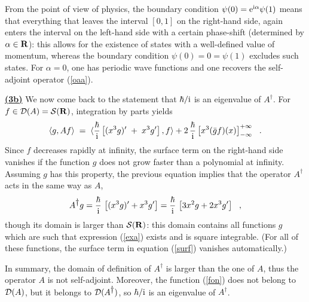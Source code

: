 \documentclass[a4wide,12pt]{report}
\begin{document}
From the point of view of physics, the boundary condition 
$\psi(0) = 
{\rm e}^{\ri \alpha} \psi(1)$ means that everything that 
leaves the interval $[ 0,1]$ on the right-hand side, again enters 
the interval on the left-hand side with a certain phase-shift
(determined by $\alpha \in \br$):
this allows for the existence of states with a well-defined value of
momentum, whereas the boundary condition $\psi(0) = 0 = \psi(1)$
excludes such states. 
For $\alpha =0$, one has periodic wave functions and one 
recovers the self-adjoint operator (\ref{oaa}).

 
\bigskip
 
\underline{{\bf (3b)}}
We now come back to the statement that $\hbar /\ri$ is an eigenvalue of 
$A^{\dag}$.
For $f \in {\cal D}(A) = \st$, 
integration by parts yields
\begin{equation}
\label{surf}
\langle g, A f \rangle \; = \;  \langle \ds{\hbar \over \ri} \left[
(x^3 g)^{\prime} \; + \; 
x^3 g^{\prime} \right] , f \rangle +
2 \, \ds{\hbar \over \ri} \left[
x^3 (\bar g  f)(x) \right]_{-\infty}^{+\infty}
\ \ .
\end{equation}
Since $f$ decreases rapidly at infinity, 
the surface term on the right-hand side vanishes if the function $g$
does not grow faster than a polynomial at infinity. 
Assuming $g$ has this property, 
the previous equation implies that the operator 
$A^{\dag}$ acts in the same way as $A$,
\begin{equation}
\label{exa}
A^{\dag} g = \ds{\hbar \over \ri} \, \left[ (x^3 g)^{\prime}
+x^3 g^{\prime} \right]
= \ds{\hbar \over \ri} \, \left[ 3x^2 g
+ 2 x^3 g^{\prime} \right]
\ \ ,
\end{equation}
though its domain is larger than $\st$:
this domain contains all functions $g$ which are such that  
expression  (\ref{exa}) exists and is square integrable. 
(For all of these functions, the surface term in equation 
(\ref{surf}) vanishes automatically.)
 
In summary, the domain of definition of $A^{\dag}$ is larger 
than the one of $A$, thus the operator $A$ is not self-adjoint. 
Moreover, the function (\ref{fon}) does not belong to ${\cal D}(A)$,
but it belongs to 
${\cal D}
(A^{\dag})$, so $\hbar / \ri$ is an eigenvalue of $A^{\dag}$.
 
\end{document}
